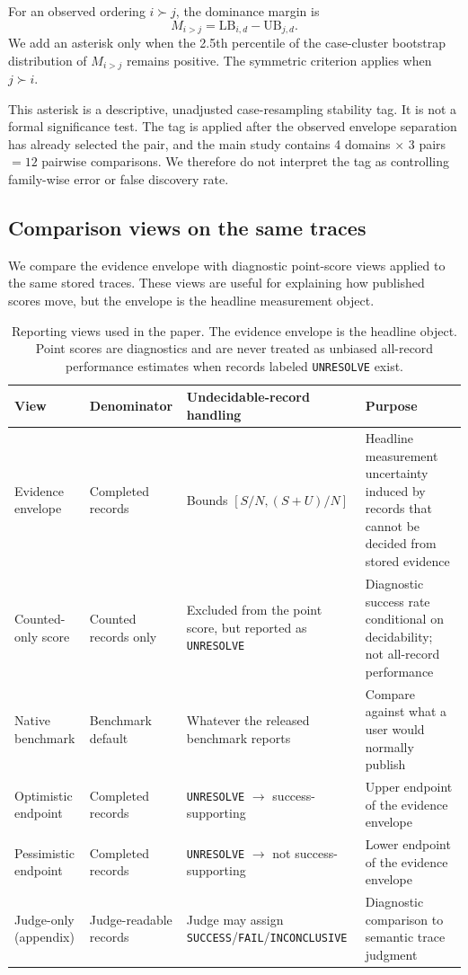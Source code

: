 \documentclass{article}
\begin{document}
For an observed ordering \(i\succ j\), the dominance margin is
\[
M_{i>j}=\mathrm{LB}_{i,d}-\mathrm{UB}_{j,d}.
\]
We add an asterisk only when the 2.5th percentile of the case-cluster bootstrap
distribution of \(M_{i>j}\) remains positive. The symmetric criterion applies
when \(j\succ i\).

This asterisk is a descriptive, unadjusted case-resampling stability tag. It is
not a formal significance test. The tag is applied after the observed envelope
separation has already selected the pair, and the main study contains
4 domains \(\times\) 3 pairs \(=12\) pairwise comparisons. We therefore do not
interpret the tag as controlling family-wise error or false discovery rate.

\subsection{Comparison views on the same traces}

We compare the evidence envelope with diagnostic point-score views applied to
the same stored traces. These views are useful for explaining how published
scores move, but the envelope is the headline measurement object.

\begin{table}[t]
\centering
\caption{Reporting views used in the paper. The evidence envelope is the
headline object. Point scores are diagnostics and are never treated as unbiased
all-record performance estimates when records labeled \texttt{UNRESOLVE}
exist.}
\label{tab:views}
\footnotesize
\setlength{\tabcolsep}{3pt}
\renewcommand{\arraystretch}{1.15}
\begin{tabularx}{\linewidth}{@{}l p{2.7cm} p{3.2cm} X@{}}
\toprule
View & Denominator & Undecidable-record handling & Purpose \\
\midrule
Evidence envelope & Completed records & Bounds \([S/N,(S+U)/N]\) & Headline measurement uncertainty induced by records that cannot be decided from stored evidence \\
Counted-only score & Counted records only & Excluded from the point score, but reported as \texttt{UNRESOLVE} & Diagnostic success rate conditional on decidability; not all-record performance \\
Native benchmark & Benchmark default & Whatever the released benchmark reports & Compare against what a user would normally publish \\
Optimistic endpoint & Completed records & \texttt{UNRESOLVE} \(\to\) success-supporting & Upper endpoint of the evidence envelope \\
Pessimistic endpoint & Completed records & \texttt{UNRESOLVE} \(\to\) not success-supporting & Lower endpoint of the evidence envelope \\
Judge-only (appendix) & Judge-readable records & Judge may assign \texttt{SUCCESS}/\texttt{FAIL}/\texttt{INCONCLUSIVE} & Diagnostic comparison to semantic trace judgment \\
\bottomrule
\end{tabularx}
\end{table}
\end{document}
